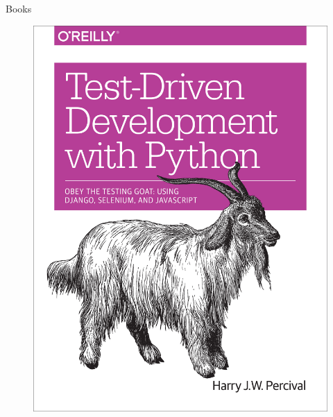 \documentclass[14pt]{beamer}
\begin{document}
\begin{frame}[plain]{Books}
    \begin{figure}
        \center
        \includegraphics[height=.7\textheight]{TDD-with-Python}
        \label{fig:TDD-with-Python}
    \end{figure}
\end{frame}
\end{document}
